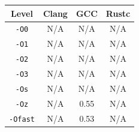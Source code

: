 \begin{tabular*}{\columnwidth}{@{\extracolsep\fill}cccc@{\extracolsep\fill}}
\toprule
\textbf{Level} & \textbf{Clang} & \textbf{GCC} & \textbf{Rustc} \\
\midrule
\texttt{-O0} & N/A & N/A & N/A \\
\texttt{-O1} & N/A & N/A & N/A \\
\texttt{-O2} & N/A & N/A & N/A \\
\texttt{-O3} & N/A & N/A & N/A \\
\texttt{-Os} & N/A & N/A & N/A \\
\texttt{-Oz} & N/A & 0.55 & N/A \\
\texttt{-Ofast} & N/A & 0.53 & N/A \\
\bottomrule
\end{tabular*}
